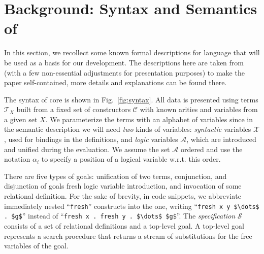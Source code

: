 \section{Background: Syntax and Semantics of \mK}
\label{sec:background}

In this section, we recollect some known formal descriptions for \mK language that will be used as a basis for our development.
The descriptions here are taken from~\cite{CertifiedSemantics} (with a few non-essential adjustments for presentation purposes) to make
the paper self-contained, more details and explanations can be found there.

The syntax of core \mK is shown in Fig.~\ref{fig:syntax}. 
All data is presented using terms $\mathcal{T}_X$ built from a fixed set of constructors $\mathcal{C}$ with known arities and variables
from a given set $X$.
We parameterize the terms with an alphabet of variables since in the semantic description we will need \emph{two} kinds of variables:
\emph{syntactic} variables $\mathcal{X}$, used for bindings in the definitions, and \emph{logic} variables $\mathcal{A}$, which are
introduced and unified during the evaluation. We assume the set $\mathcal{A}$ ordered and use the notation $\alpha_i$ 
to specify a position of a logical variable w.r.t. this order.

There are five types of goals: unification of two terms, conjunction, and disjunction of goals
fresh logic variable introduction, and invocation of some relational definition. For the sake of brevity, in code snippets, we abbreviate
immediately nested ``\lstinline|fresh|'' constructs into the one, writing ``\lstinline|fresh x y $\dots$ . $g$|'' instead of
``\lstinline|fresh x . fresh y . $\dots$ $g$|''. The \emph{specification} $\mathcal{S}$ consists of a set of relational definitions and a top-level goal.
A top-level goal represents a search procedure that returns a stream of substitutions for the free variables of the goal.


